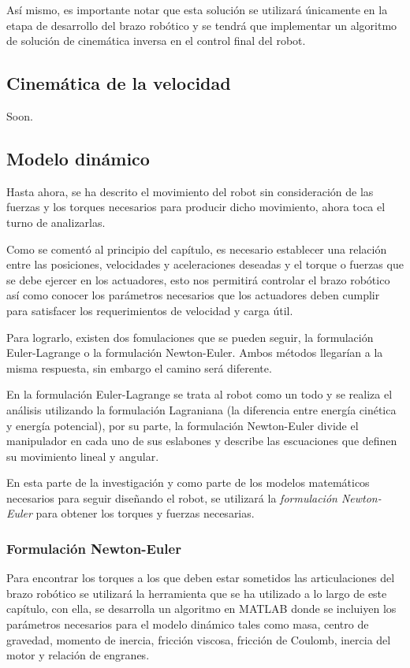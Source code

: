 Así mismo, es importante notar que esta solución se utilizará únicamente en la etapa de desarrollo del brazo robótico y se tendrá que implementar un algoritmo de solución de cinemática inversa en el control final del robot.

\subsection{Cinemática de la velocidad}

Soon.

\subsection{Modelo dinámico}

Hasta ahora, se ha descrito el movimiento del robot sin consideración de las fuerzas y los torques necesarios para producir dicho movimiento, ahora toca el turno de analizarlas.

Como se comentó al principio del capítulo, es necesario establecer una relación entre las posiciones, velocidades y aceleraciones deseadas y el torque o fuerzas que se debe ejercer en los actuadores, esto nos permitirá controlar el brazo robótico así como conocer los parámetros necesarios que los actuadores deben cumplir para satisfacer los requerimientos de velocidad y carga útil.

Para lograrlo, existen dos fomulaciones que se pueden seguir, la formulación Euler-Lagrange o la formulación Newton-Euler. Ambos métodos llegarían a la misma respuesta, sin embargo el camino será diferente.

En la formulación Euler-Lagrange se trata al robot como un todo y se realiza el análisis utilizando la formulación Lagraniana (la diferencia entre energía cinética y energía potencial), por su parte, la formulación Newton-Euler divide el manipulador en cada uno de sus eslabones y describe las escuaciones que definen su movimiento lineal y angular. \cite{Spong2005}

En esta parte de la investigación y como parte de los modelos matemáticos necesarios para seguir diseñando el robot, se utilizará la \textit{formulación Newton-Euler} para obtener los torques y fuerzas necesarias. 

\subsubsection{Formulación Newton-Euler}

Para encontrar los torques a los que deben estar sometidos las articulaciones del brazo robótico se utilizará la herramienta que se ha utilizado a lo largo de este capítulo, con ella, se desarrolla un algoritmo en MATLAB donde se incluiyen los parámetros necesarios para el modelo dinámico tales como masa, centro de gravedad, momento de inercia, fricción viscosa, fricción de Coulomb, inercia del motor y relación de engranes. 

